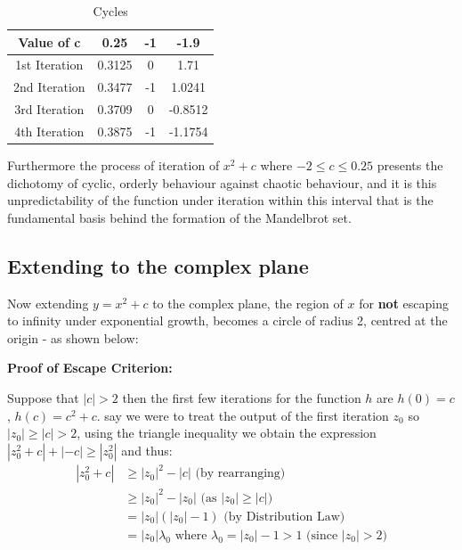 \documentclass[a4paper]{article}
\begin{document}
\begin{table}[h]
\parbox{.9\linewidth}{
\centering
\begin{tabular}[h]{||c c c c||} 
        \hline
        Value of c & 0.25 & -1 & -1.9 \\ [0.5ex] 
        \hline\hline
        1st Iteration & 0.3125 & 0 & 1.71 \\ 
        \hline
        2nd Iteration & 0.3477 & -1 & 1.0241 \\
        \hline
        3rd Iteration & 0.3709 & 0 & -0.8512  \\
        \hline
        4th Iteration & 0.3875 & -1 & -1.1754 \\ [1ex]
        \hline
\end{tabular}
\caption{Cycles}
}
\end{table}

Furthermore the process of iteration of $x^2 +c$ where $-2\leq c \leq 0.25$ presents the dichotomy of cyclic, orderly behaviour against chaotic behaviour, and it is this unpredictability of the function under iteration within this interval that is the fundamental basis behind the formation of the Mandelbrot set.

\subsection{Extending to the complex plane}

Now extending $y = x^2 + c$ to the complex plane, the region of $x$ for \textbf{not} escaping to infinity under exponential growth, becomes a circle of radius 2, centred at the origin - as shown below:

\textbf{Proof of Escape Criterion: }

Suppose that $|c|>2$ then the first few iterations for the function $h$ are $h(0)=c$, $h(c)=c^2+c$. 
say we were to treat the output of the first iteration $z_{0}$ so $|z_{0}| \geq |c| > 2$, using the triangle inequality we obtain the expression $|z_{0}^2 + c| + |-c| \geq |z_{0}^2|$ and thus: 
\begin{align*}
|z_{0}^2 + c| & \geq |z_{0}|^2 -|c| \mbox{ (by rearranging)}\\
          & \geq |z_{0}|^2 -|z_{0}| \mbox{ (as } |z_{0}| \geq |c| \mbox{)}\\
          & = |z_{0}|(|z_{0}|-1) \mbox{ (by Distribution Law)}\\
          & = |z_{0}|\lambda_{0} \mbox{ where } \lambda_{0}=|z_{0}|-1>1 \mbox{ (since } |z_{0}| > 2 \mbox{)}
\end{align*}
\end{document}
